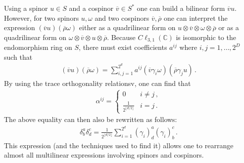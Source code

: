     Using a spinor $u\in S$ and a cospinor $\overline{v}\in S^*$ one can build a bilinear form $\overline{v}u$. However, for two spinors $u,\omega$ and two cospinors $\overline{v},\overline{\rho}$ one can interpret the expression $(\overline{v}u)(\overline{\rho}\omega)$ either as a quadrilinear form on $u\otimes\overline{v}\otimes\omega\otimes\overline{\rho}$ or as a quadrilinear form on $\omega\otimes\overline{v}\otimes u\otimes\overline{\rho}$. Because $C\ell_{3,1}(\mathbb{C})$ is isomorphic to the endomorphism ring on $S$, there must exist coefficients $a^{ij}$ where $i,j=1,\ldots,2^D$ such that
    \begin{gather}
        (\overline{v}u)(\overline{\rho}\omega) = \sum_{i,j=1}^{2^d}a^{ij}(\overline{v}\gamma_i\omega)(\overline{\rho}\gamma_ju)\,.
    \end{gather}
    By using the trace orthogonality relationsv, one can find that
    \begin{gather}
        \alpha^{ij} =
        \begin{cases}
            0&i\neq j\,,\\
            \frac{1}{2^{\lfloor d/2 \rfloor}}&i=j\,.
        \end{cases}
    \end{gather}
    The above equality can then also be rewritten as follows:
    \begin{gather}
        \delta_b^a\delta_d^c = \frac{1}{2^{\lfloor d/2 \rfloor}}\sum_{i=1}^{2^d}(\gamma_i)_d^a(\gamma_i)_b^c\,.
    \end{gather}
    This expression (and the techniques used to find it) allows one to rearrange almost all multilinear expressions involving spinors and cospinors.